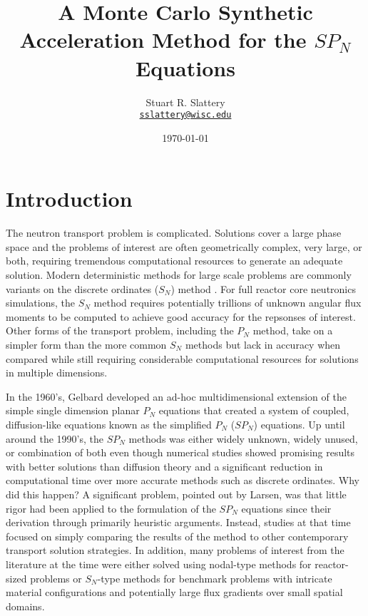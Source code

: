 \documentclass[letterpaper,12pt]{article}
\author{Stuart R. Slattery
  \\ \href{mailto:sslattery@wisc.edu}{\texttt{sslattery@wisc.edu}}
}
\date{\today}
\title{A Monte Carlo Synthetic Acceleration Method for the $SP_N$ Equations}
\begin{document}
\maketitle

\section{Introduction}
\label{sec:introduction}
The neutron transport problem is complicated. Solutions cover a large
phase space and the problems of interest are often geometrically
complex, very large, or both, requiring tremendous computational
resources to generate an adequate solution. Modern deterministic
methods for large scale problems are commonly variants on the discrete
ordinates ($S_N$) method \cite{evans_denovo:_2010}. For full reactor
core neutronics simulations, the $S_N$ method requires potentially
trillions of unknown angular flux moments to be computed to achieve
good accuracy for the repsonses of interest. Other forms of the
transport problem, including the $P_N$ method, take on a simpler form
than the more common $S_N$ methods but lack in accuracy when compared
while still requiring considerable computational resources for
solutions in multiple dimensions.

In the 1960's, Gelbard developed an ad-hoc multidimensional extension
of the simple single dimension planar $P_N$ equations that created a
system of coupled, diffusion-like equations known as the simplified
$P_N$ ($SP_N$) equations. Up until around the 1990's, the $SP_N$
methods was either widely unknown, widely unused, or combination of
both even though numerical studies showed promising results with
better solutions than diffusion theory and a significant reduction in
computational time over more accurate methods such as discrete
ordinates. Why did this happen? A significant problem, pointed out by
Larsen, was that little rigor had been applied to the formulation of
the $SP_N$ equations since their derivation through primarily
heuristic arguments. Instead, studies at that time focused on simply
comparing the results of the method to other contemporary transport
solution strategies. In addition, many problems of interest from the
literature at the time were either solved using nodal-type methods for
reactor-sized problems or $S_N$-type methods for benchmark problems
with intricate material configurations and potentially large flux
gradients over small spatial domains.
\end{document}
